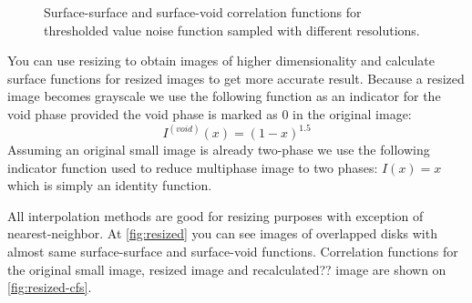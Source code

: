 \documentclass[reprint,amsmath,amssymb,aps,pre,showkeys,showpacs]{revtex4-1}
\begin{document}
\begin{figure}[ht]
  \centering
  \hfill
    \caption[]{Surface-surface and surface-void correlation functions for
      thresholded value noise function sampled with different resolutions.}
    \label{fig:scaling-noise}
\end{figure}

You can use resizing to obtain images of higher dimensionality and calculate
surface functions for resized images to get more accurate result. Because a
resized image becomes grayscale we use the following function as an indicator
for the void phase provided the void phase is marked as 0 in the original image:
\begin{equation*}
  I^{(void)}(x) = (1 - x)^{1.5}
\end{equation*}
Assuming an original small image is already two-phase we use the following
indicator function used to reduce multiphase image to two phases: $I(x) = x$
which is simply an identity function.

All interpolation methods are good for resizing purposes with exception of
nearest-neighbor. At \cref{fig:resized} you can see images of overlapped disks
with almost same surface-surface and surface-void functions. Correlation
functions for the original small image, resized image and recalculated?? image
are shown on \cref{fig:resized-cfs}.
\end{document}
